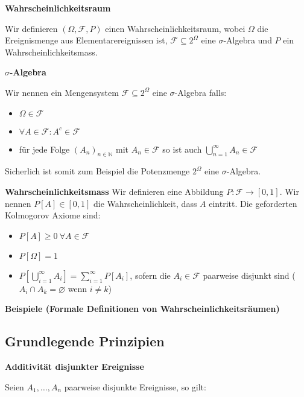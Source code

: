 \documentclass[25pt]{sciposter}
\newcommand{\N}{\mathbb{N}}
\newcommand{\F}{\mathcal{F}}
\newenvironment{method}[1]{\begin{mdframed}[backgroundcolor=blue!10,innertopmargin=15pt, innerbottommargin=15pt,nobreak=true]
		\textbf{#1 }
	}
	{ 
	\end{mdframed}
}
\newenvironment{thm}[1]{\begin{mdframed}[backgroundcolor=pink!20,innertopmargin=15pt, innerbottommargin=15pt, nobreak=true]
		\textbf{#1 }
	}
	{ 
	\end{mdframed}
}
\begin{document}
\begin{multicols}{3}
		\begin{method}{Wahrscheinlichkeitsraum}
			Wir definieren $(\Omega, \mathcal{F}, P)$ einen Wahrscheinlichkeitsraum, wobei $\Omega$ die Ereignismenge aus Elementarereignissen ist, $\F \subseteq 2^\Omega$ eine $\sigma$-Algebra und $P$ ein Wahrscheinlichkeitsmass.
		\end{method}
		
		\begin{method}{$\sigma$-Algebra}
			Wir nennen ein Mengensystem $\F\subseteq 2^\Omega$ eine $\sigma$-Algebra falls:
			\begin{itemize}
				\item $\Omega \in \F$
				\item $\forall A \in \F : A^c \in \F$
				\item für jede Folge $(A_n)_{n\in\N}$ mit $A_n \in \F$ so ist auch $\bigcup_{n=1}^\infty A_n \in \F $
			\end{itemize}
			
			Sicherlich ist somit zum Beispiel die Potenzmenge $2^\Omega$ eine $\sigma$-Algebra.
		\end{method}
		
		\begin{method}{Wahrscheinlichkeitsmass} Wir definieren eine Abbildung $P: \F \to [0,1]$. Wir nennen $P[A]\in[0,1]$ die Wahrscheinlichkeit, dass $A$ eintritt. Die geforderten Kolmogorov Axiome sind:
			\begin{itemize}
				\item $P[A]\geq 0 \ \forall A \in \F$
				\item $P[\Omega] = 1$
				\item $P\left[ \bigcup_{i=1}^{\infty} A_i \right] = \sum_{i=1}^{\infty}P[A_i]$, sofern die $A_i \in \F$ paarweise disjunkt sind ($A_i \cap A_k = \varnothing$ wenn $i \neq k$) 
			\end{itemize}
		\end{method}
		
		\textbf{Beispiele (Formale Definitionen von Wahrscheinlichkeitsräumen)}
		
		
		
		\subsection*{Grundlegende Prinzipien}
		
		
		
		\begin{thm}{Additivität disjunkter Ereignisse}
			Seien $A_1, \ldots, A_n$ paarweise disjunkte Ereignisse, so gilt:
			

\end{thm}
\end{multicols}
\end{document}
